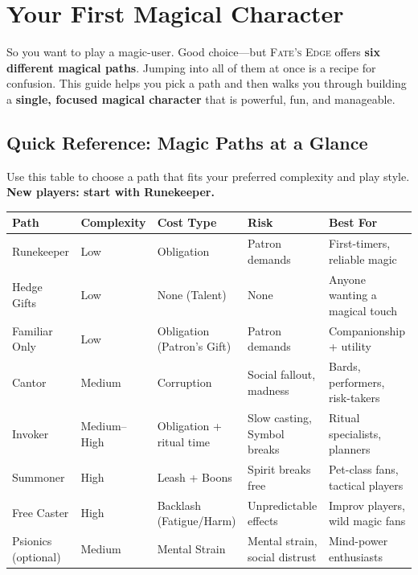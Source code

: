 \chapter{Your First Magical Character}
\label{ch:first-magical}

So you want to play a magic-user. Good choice---but \textsc{Fate's Edge} offers \textbf{six different magical paths}. Jumping into all of them at once is a recipe for confusion. This guide helps you pick a path and then walks you through building a \textbf{single, focused magical character} that is powerful, fun, and manageable.

\section*{Quick Reference: Magic Paths at a Glance}

Use this table to choose a path that fits your preferred complexity and play style. \textbf{New players: start with Runekeeper.}

\begin{center}
\small
\renewcommand{\arraystretch}{1.3}
\begin{tabular}{lllll}
\toprule
\textbf{Path} & \textbf{Complexity} & \textbf{Cost Type} & \textbf{Risk} & \textbf{Best For} \\
\midrule
Runekeeper & Low & Obligation & Patron demands & First-timers, reliable magic \\
Hedge Gifts & Low & None (Talent) & None & Anyone wanting a magical touch \\
Familiar Only & Low & Obligation (Patron's Gift) & Patron demands & Companionship + utility \\
Cantor & Medium & Corruption & Social fallout, madness & Bards, performers, risk-takers \\
Invoker & Medium--High & Obligation + ritual time & Slow casting, Symbol breaks & Ritual specialists, planners \\
Summoner & High & Leash + Boons & Spirit breaks free & Pet-class fans, tactical players \\
Free Caster & High & Backlash (Fatigue/Harm) & Unpredictable effects & Improv players, wild magic fans \\
Psionics (optional) & Medium & Mental Strain & Mental strain, social distrust & Mind-power enthusiasts \\
\bottomrule
\end{tabular}
\end{center}

